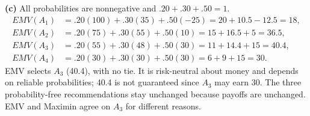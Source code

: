 \textbf{(c)} All probabilities are nonnegative and $.20+.30+.50=1$.
\begin{align*}
EMV(A_1)&=.20(100)+.30(35)+.50(-25)=20+10.5-12.5=18,\\
EMV(A_2)&=.20(75)+.30(55)+.50(10)=15+16.5+5=36.5,\\
EMV(A_3)&=.20(55)+.30(48)+.50(30)=11+14.4+15=40.4,\\
EMV(A_4)&=.20(30)+.30(30)+.50(30)=6+9+15=30.
\end{align*}
EMV selects $A_3$ (40.4), with no tie. It is risk-neutral about money and depends on reliable probabilities; 40.4 is not guaranteed since $A_3$ may earn 30. The three probability-free recommendations stay unchanged because payoffs are unchanged. EMV and Maximin agree on $A_3$ for different reasons.



